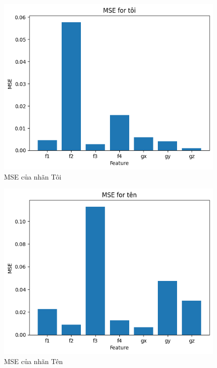 \begin{figure}[H]
    \centering
    \includegraphics[width=1\textwidth]{Images/Improvement results/MSE_toi.png}
    \caption{MSE của nhãn Tôi}
    \label{fig:timegan_mse}
\end{figure}

\begin{figure}[H]
    \centering
    \includegraphics[width=1\textwidth]{Images/Improvement results/MSE_ten.png}
    \caption{MSE của nhãn Tên}
    \label{fig:timegan_mse}
\end{figure}

